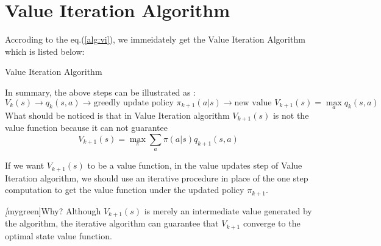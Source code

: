 \section{Value Iteration Algorithm}
Accroding to the eq.(\ref{alg:vi}), we immeidately get the Value Iteration Algorithm which is listed below:
\begin{algorithm}
    \caption{Value Iteration Algorithm}

\end{algorithm}\par
In summary, the above steps can be illustrated as :
\begin{equation*}
    V_{k}(s) \to q_{k}(s,a) \to \text{greedly update policy } \pi_{k+1}(a|s) \to \text{new value } V_{k+1}(s) = \max_{a}q_{k}(s,a)
\end{equation*}
What should be noticed is that in Value Iteration algorithm $V_{k+1}(s)$ is not the value function because it can not guarantee
\begin{equation*}
    V_{k+1}(s) = \max_{\pi}\sum_{a}\pi(a|s)q_{k+1}(s,a)
\end{equation*}

If we want $V_{k+1}(s)$ to be a value function, in the value updates step of Value Iteration algorithm, we should use an iterative procedure in place of the one step computation to get the value function under the updated policy $\pi_{k+1}$. \par
\emph[mygreen]{Why?} Although $V_{k+1}(s)$ is merely an intermediate value generated by the algorithm, the iterative algorithm can guarantee that $V_{k+1}$ converge to the optimal state value function.  

